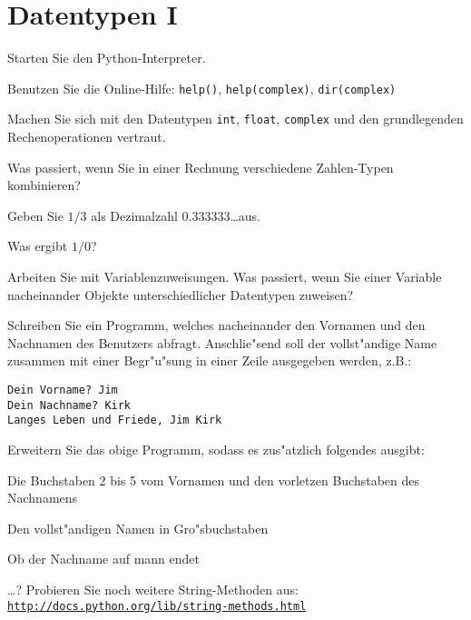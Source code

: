 \section*{Datentypen I}

\begin{aufgabe}
Starten Sie den Python-Interpreter.
\begin{auflistung}
\item Benutzen Sie die Online-Hilfe: \lstinline{help()}, \lstinline{help(complex)}, \lstinline{dir(complex)}
\item Machen Sie sich mit den Datentypen \texttt{int}, \texttt{float}, \texttt{complex} und den grundlegenden Rechenoperationen vertraut.
\item Was passiert, wenn Sie in einer Rechnung verschiedene Zahlen-Typen kombinieren?
\item Geben Sie $1/3$ als Dezimalzahl $0.333333$\dots aus.
\item Was ergibt $1/0$?
\item Arbeiten Sie mit Variablenzuweisungen. Was passiert, wenn Sie einer Variable nacheinander Objekte unterschiedlicher Datentypen zuweisen?
\end{auflistung}
\end{aufgabe}

\begin{aufgabe}[Strings]
\begin{teilaufgabe}
Schreiben Sie ein Programm, welches nacheinander den Vornamen und den Nachnamen des Benutzers abfragt. Anschlie"send soll der vollst"andige Name zusammen mit einer Begr"u"sung in einer Zeile ausgegeben werden, z.B.:
\begin{lstlisting}
Dein Vorname? Jim
Dein Nachname? Kirk
Langes Leben und Friede, Jim Kirk
\end{lstlisting}
\end{teilaufgabe}
\begin{teilaufgabe}
Erweitern Sie das obige Programm, sodass es zus"atzlich folgendes ausgibt:
\begin{auflistung}
\item Die Buchstaben 2 bis 5 vom Vornamen und den vorletzen Buchstaben des Nachnamens
\item Den vollst"andigen Namen in Gro"sbuchstaben
\item Ob der Nachname auf \glqq mann\grqq{}  endet
\item \dots ? Probieren Sie noch weitere String-Methoden aus:\\ \texttt{\underline{http://docs.python.org/lib/string-methods.html}}
\end{auflistung}
\end{teilaufgabe}
\end{aufgabe}

